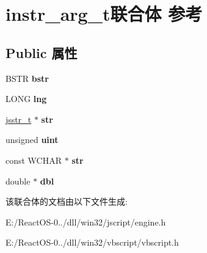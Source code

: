 \hypertarget{unioninstr__arg__t}{}\section{instr\+\_\+arg\+\_\+t联合体 参考}
\label{unioninstr__arg__t}
\subsection*{Public 属性}
\begin{DoxyCompactItemize}
\item 
\mbox{\label{unioninstr__arg__t_acc85c9759a5761d7793ceb8976fe1a83}} 
B\+S\+TR {\bfseries bstr}
\item 
\mbox{\label{unioninstr__arg__t_a2c07f09fcca6015b9e427786933d7c1b}} 
L\+O\+NG {\bfseries lng}
\item 
\mbox{\label{unioninstr__arg__t_a8fd801af35082d981ed2bdc60b34ec20}} 
\hyperlink{struct__jsstr__t}{jsstr\+\_\+t} $\ast$ {\bfseries str}
\item 
\mbox{\label{unioninstr__arg__t_a20c7eec1754bb28f9dddc2f30a465147}} 
unsigned {\bfseries uint}
\item 
\mbox{\label{unioninstr__arg__t_af1ca386e7da60062e9aa95ab09d5edeb}} 
const W\+C\+H\+AR $\ast$ {\bfseries str}
\item 
\mbox{\label{unioninstr__arg__t_a8e035ce8d7c479320b6d6841d8f871c1}} 
double $\ast$ {\bfseries dbl}
\end{DoxyCompactItemize}


该联合体的文档由以下文件生成\+:\begin{DoxyCompactItemize}
\item 
E\+:/\+React\+O\+S-\/0../dll/win32/jscript/engine.\+h\item 
E\+:/\+React\+O\+S-\/0../dll/win32/vbscript/vbscript.\+h\end{DoxyCompactItemize}
